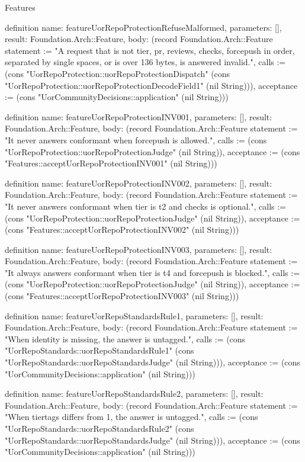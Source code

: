 \begin{lexlean}{Features}
\begin{semanticmodule}
definition{
  name: featureUorRepoProtectionRefuseMalformed,
  parameters: [],
  result: Foundation.Arch::Feature,
  body: (record Foundation.Arch::Feature {statement := "A request that is not tier, pr, reviews, checks, forcepush in order, separated by single spaces, or is over 136 bytes, is answered invalid.", calls := (cons "UorRepoProtection::uorRepoProtectionDispatch" (cons "UorRepoProtection::uorRepoProtectionDecodeField1" (nil String))), acceptance := (cons "UorCommunityDecisions::application" (nil String))})
}

definition{
  name: featureUorRepoProtectionINV001,
  parameters: [],
  result: Foundation.Arch::Feature,
  body: (record Foundation.Arch::Feature {statement := "It never answers conformant when forcepush is allowed.", calls := (cons "UorRepoProtection::uorRepoProtectionJudge" (nil String)), acceptance := (cons "Features::acceptUorRepoProtectionINV001" (nil String))})
}

definition{
  name: featureUorRepoProtectionINV002,
  parameters: [],
  result: Foundation.Arch::Feature,
  body: (record Foundation.Arch::Feature {statement := "It never answers conformant when tier is t2 and checks is optional.", calls := (cons "UorRepoProtection::uorRepoProtectionJudge" (nil String)), acceptance := (cons "Features::acceptUorRepoProtectionINV002" (nil String))})
}

definition{
  name: featureUorRepoProtectionINV003,
  parameters: [],
  result: Foundation.Arch::Feature,
  body: (record Foundation.Arch::Feature {statement := "It always answers conformant when tier is t4 and forcepush is blocked.", calls := (cons "UorRepoProtection::uorRepoProtectionJudge" (nil String)), acceptance := (cons "Features::acceptUorRepoProtectionINV003" (nil String))})
}

definition{
  name: featureUorRepoStandardsRule1,
  parameters: [],
  result: Foundation.Arch::Feature,
  body: (record Foundation.Arch::Feature {statement := "When identity is missing, the answer is untagged.", calls := (cons "UorRepoStandards::uorRepoStandardsRule1" (cons "UorRepoStandards::uorRepoStandardsJudge" (nil String))), acceptance := (cons "UorCommunityDecisions::application" (nil String))})
}

definition{
  name: featureUorRepoStandardsRule2,
  parameters: [],
  result: Foundation.Arch::Feature,
  body: (record Foundation.Arch::Feature {statement := "When tiertags differs from 1, the answer is untagged.", calls := (cons "UorRepoStandards::uorRepoStandardsRule2" (cons "UorRepoStandards::uorRepoStandardsJudge" (nil String))), acceptance := (cons "UorCommunityDecisions::application" (nil String))})
}


\end{semanticmodule}
\end{lexlean}
